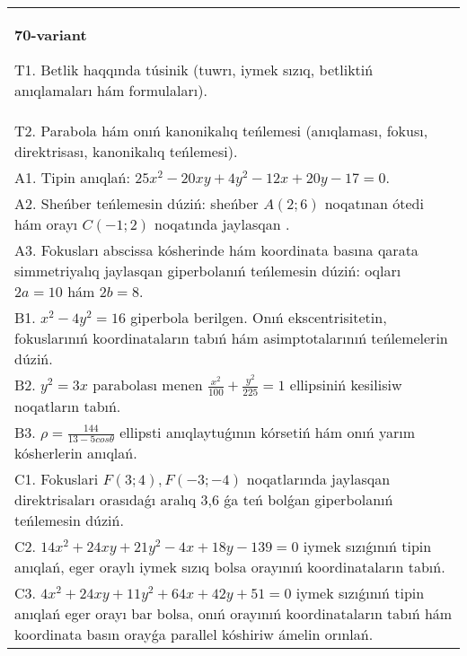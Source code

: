 \documentclass{article}
\begin{document}
\begin{tabular}{m{17cm}}
\textbf{70-variant}
\newline

T1. Betlik haqqında túsinik (tuwrı, iymek sızıq, betliktiń anıqlamaları hám formulaları).\\

T2. Parabola hám onıń kanonikalıq teńlemesi (anıqlaması, fokusı, direktrisası, kanonikalıq teńlemesi).\\

A1. Tipin anıqlań: $25 x^{2}-20 xy+4 y^{2}-12 x+20 y-17=0$.\\

A2. Sheńber teńlemesin dúziń: sheńber $A (2;6 ) $ noqatınan ótedi hám orayı $C (-1;2) $ noqatında jaylasqan .\\

A3. Fokusları abscissa kósherinde hám koordinata basına qarata simmetriyalıq jaylasqan giperbolanıń teńlemesin dúziń: oqları $2 a=10$ hám $2 b=8$.\\

B1. $x^{2} - 4y^{2} = 16$ giperbola berilgen. Onıń ekscentrisitetin, fokuslarınıń koordinataların tabıń hám asimptotalarınıń teńlemelerin dúziń.\\

B2. $y^{2} = 3x$ parabolası menen $\frac{x^{2}}{100} + \frac{y^{2}}{225} = 1$ ellipsiniń kesilisiw noqatların tabıń.  \\

B3. $\rho = \frac{144}{13 - 5cos\theta}$ ellipsti anıqlaytuǵının kórsetiń hám onıń yarım kósherlerin anıqlań.\\

C1. Fokuslari $F(3;4), F(-3;-4)$ noqatlarında jaylasqan direktrisaları orasıdaǵı aralıq 3,6 ǵa teń bolǵan giperbolanıń teńlemesin dúziń.  \\

C2. $14x^{2} + 24xy + 21y^{2} - 4x + 18y - 139 = 0$ iymek sızıǵınıń tipin anıqlań, eger oraylı iymek sızıq bolsa orayınıń koordinataların tabıń.  \\

C3. $4x^{2} + 24xy + 11y^{2} + 64x + 42y + 51 = 0$ iymek sızıǵınıń tipin anıqlań eger orayı bar bolsa, onıń orayınıń koordinataların tabıń hám koordinata basın orayǵa parallel kóshiriw ámelin orınlań.  \\

\end{tabular}
\vspace{1cm}
\end{document}
